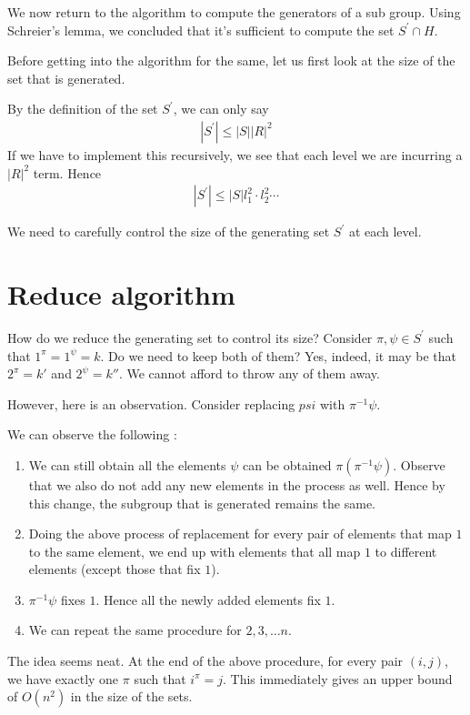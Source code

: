 We now return to the algorithm to compute the generators of a sub group. Using Schreier's lemma, we concluded that it's sufficient to compute the set $S^\prime \cap H$. 

Before getting into the algorithm for the same, let us first
look at the size of the set that is generated. 

By the definition of the set $S^\prime$, we can only say
\begin{align}
|S^{\prime}| \leq |S| |R|^2 
\end{align}
If we have to implement this recursively, we see
that each level we are incurring a $|R|^2$ term. 
Hence 
\begin{align}
|S^{\prime}| \leq |S| l_1^2 \cdot l_2^2 \cdots 
\end{align}

We need to carefully control the size of the generating
set $S^\prime$ at each level.

\section{{\sc Reduce} algorithm}

How do we reduce the generating set to control its size? Consider $\pi, \psi \in S^\prime$ such that $1^\pi = 1^\psi = k$. Do we need to keep both of them? Yes, indeed, it may be that $2^\pi = k'$ and $2^\psi = k''$. We cannot afford to throw any of them away. 

However, here is an observation. Consider replacing $psi$ with 
$\pi^{-1} \psi$.

We can observe the following : 
\begin{enumerate}
\item We can still obtain all the elements $\psi$ can be obtained $\pi(\pi^{-1} \psi)$. Observe that we also do not add any new elements 
in the process as well. Hence by this change, the subgroup that is generated remains the same.
\item Doing the above process of replacement for every pair of elements that map $1$ to the same element, we end up with elements that all map $1$ to different elements (except those that fix $1$).
\item $\pi^{-1}\psi$ fixes $1$. Hence all the newly added elements fix $1$.
\item We can repeat the same procedure for $2,3,\ldots n$.
\end{enumerate}

The idea seems neat. At the end of the above procedure, for every pair $(i,j)$, we have exactly one $\pi$ such that $i^{\pi} = j$. This immediately gives an upper bound of $O(n^2)$ in the size of the sets.

